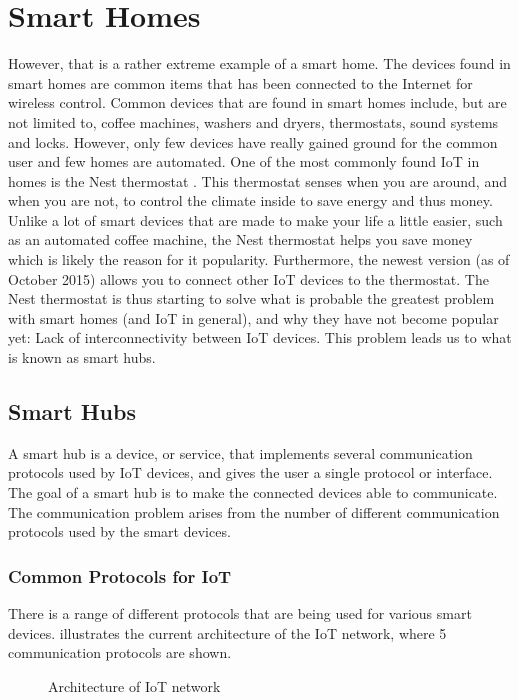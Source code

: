 \section{Smart Homes}\label{sec:smarthomes}
However, that is a rather extreme example of a smart home. 
The devices found in smart homes are common items that has been connected to the Internet for wireless control.
Common devices that are found in smart homes include, but are not limited to, 
coffee machines, washers and dryers, thermostats, sound systems and locks. 
However, only few devices have really gained ground for the common user and few homes are automated.
One of the most commonly found IoT in homes is the Nest thermostat \cite{NEST}. 
This thermostat senses when you are around, and when you are not, 
to control the climate inside to save energy and thus money.
Unlike a lot of smart devices that are made to make your life a little easier, such as an automated coffee machine, 
the Nest thermostat helps you save money which is likely the reason for it popularity. 
Furthermore, the newest version (as of October 2015) allows you to connect other IoT devices to the thermostat. 
The Nest thermostat is thus starting to solve what is probable the greatest problem with smart homes (and IoT in general), 
and why they have not become popular yet: Lack of interconnectivity between IoT devices. 
This problem leads us to what is known as smart hubs. 

\subsection{Smart Hubs}
A smart hub is a device, or service, that implements several communication protocols used by IoT devices, 
and gives the user a single protocol or interface. 
The goal of a smart hub is to make the connected devices able to communicate.
The communication problem arises from the number of different communication protocols used by the smart devices. 


\subsubsection{Common Protocols for IoT}
There is a range of different protocols that are being used for various smart devices. 
 illustrates the current architecture of the IoT network,
where \num{5} communication protocols are shown. 

\begin{figure}[!htb]
    \centering
    
    \caption{Architecture of IoT network}
    \label{fig:IoTProtocols}
\end{figure}

